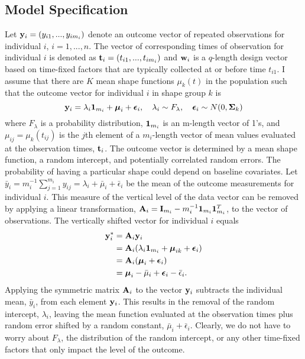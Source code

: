 \subsection{Model Specification}\label{sub:vmod}
Let $\mathbf y_{i}=(y_{i1},...,y_{im_{i}})$ denote an outcome vector of repeated observations for individual $i$, $i=1,...,n$. The vector of corresponding times of observation for individual $i$ is denoted as $\mathbf t_{i}=(t_{i1},...,t_{im_{i}})$ and $\mathbf w_{i}$ is a $q$-length design vector based on time-fixed factors that are typically collected at or before time $t_{i1}$. I assume that there are $K$ mean shape functions $\mu_{k}(t)$ in the population such that the outcome vector for individual $i$ in shape group $k$ is
 $$\mathbf y_{i} = \lambda_{i}\mathbf 1_{m_{i}}+\boldsymbol\mu_{i}+\boldsymbol\epsilon_{i},\quad \lambda_{i}\sim F_{\lambda}, \quad \boldsymbol\epsilon_{i}\sim N(0,\boldsymbol\Sigma_{k})$$
 where $F_{\lambda}$ is a probability distribution, $\mathbf 1_{m_{i}}$ is an m-length vector of 1's, and $\mu_{ij} = \mu_{k}(t_{ij})$ is the $j$th element of a $m_{i}$-length vector of mean values evaluated at the observation times, $\mathbf t_{i}$. The outcome vector is determined by a mean shape function, a random intercept, and potentially correlated random errors. The probability of having a particular shape could depend on baseline covariates. Let $\bar{y}_{i}= m_{i}^{-1}\sum^{m_{i}}_{j=1} y_{ij} = \lambda_{i}+\bar{\mu}_{i}+\bar{\epsilon}_{i}$ be the mean of the outcome measurements for individual $i$. This measure of the vertical level of the data vector can be removed by applying a linear transformation, $\mathbf A_{i} = \mathbf I_{m_{i}} - m_{i}^{-1}\mathbf 1_{m_{i}}\mathbf 1_{m_{i}}^{T}$, to the vector of observations. The vertically shifted vector for individual $i$ equals 
\begin{align*}
\mathbf y^{*}_{i} &= \mathbf A_{i}\mathbf y_{i}\\
&=\mathbf A_{i}(\lambda_{i}\mathbf 1_{m_{i}}+\boldsymbol\mu_{ik}+\boldsymbol\epsilon_{i})\\
&=\mathbf A_{i}(\boldsymbol\mu_{i}+\boldsymbol\epsilon_{i})\\
&=\boldsymbol\mu_{i} - \bar{\mu}_{i}+\boldsymbol\epsilon_{i}-\bar{\epsilon}_{i}.
\end{align*}
Applying the symmetric matrix $\mathbf A_{i}$ to the vector $\mathbf y_{i}$ subtracts the individual mean, $\bar{y}_{i}$, from each element $\mathbf y_{i}$. This results in the removal of the random intercept, $\lambda_{i}$, leaving the mean function evaluated at the observation times plus random error shifted by a random constant, $\bar{\mu}_{i}+\bar{\epsilon}_{i}$. Clearly, we do not have to worry about $F_{\lambda}$, the distribution of the random intercept, or any other time-fixed factors that only impact the level of the outcome. 

